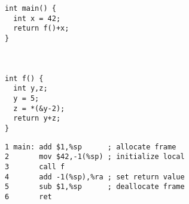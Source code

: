 \documentclass[acmsmall,review,anonymous]{acmart}\settopmatter{printfolios=true,printccs=false,printacmref=false}
\begin{document}
\begin{figure}
\begin{subfigure}[t]{.25\textwidth}
{\small
\begin{verbatim}
int main() {
  int x = 42;
  return f()+x;
}



int f() {
  int y,z;
  y = 5;
  z = *(&y-2);
  return y+z;
}
\end{verbatim}
}
\end{subfigure}
\begin{subfigure}[t]{.5\textwidth}
{\small
\begin{verbatim}
1 main: add $1,%sp      ; allocate frame
2       mov $42,-1(%sp) ; initialize local
3       call f
4       add -1(%sp),%ra ; set return value
5       sub $1,%sp      ; deallocate frame
6       ret


\end{verbatim}}
\end{subfigure}
\end{figure}
\end{document}
